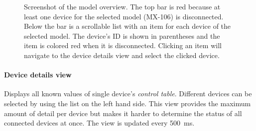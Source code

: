 \begin{figure}[H]
    \centering
    \setlength{\fboxsep}{0mm}
    \caption[Screenshot of the model overview]{
        Screenshot of the model overview. The top bar is red because at least one device for the
        selected model (MX-106) is disconnected. Below the bar is a scrollable list with an item for
        each device of the selected model. The device's ID is shown in parentheses and the item is
        colored red when it is disconnected. Clicking an item will navigate to the device details view
        and select the clicked device.
    }
\end{figure}

\paragraph{Device details view}

Displays all known values of single device's \textit{control table}. Different devices can be selected
by using the list on the left hand side. This view provides the maximum amount of detail per device
but makes it harder to determine the status of all connected devices at once. The view is updated every
\SI{500}{\milli\second}.

